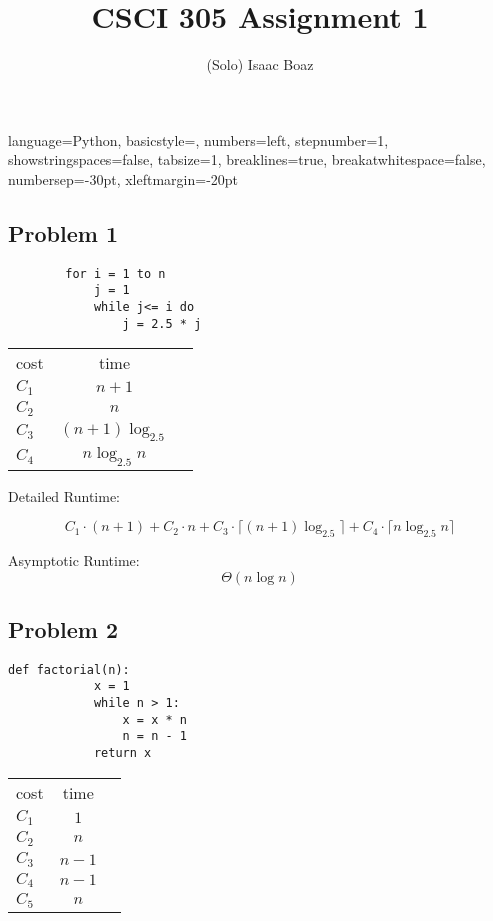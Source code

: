\documentclass{article}
\title{CSCI 305 Assignment 1}
\author{(Solo) Isaac Boaz}
\begin{document}
\maketitle

\lstset
{ %
    language=Python,
    basicstyle=\footnotesize,
    numbers=left,
    stepnumber=1,
    showstringspaces=false,
    tabsize=1,
    breaklines=true,
    breakatwhitespace=false,
    numbersep=-30pt,
    xleftmargin=-20pt
}
\setlength{\columnseprule}{0.1pt}

\subsection*{Problem 1}
\begin{multicols}{2}
    \begin{lstlisting}
        for i = 1 to n
            j = 1
            while j<= i do
                j = 2.5 * j
    \end{lstlisting}
    \columnbreak
    \footnotesize
    \begin{tabular}{lcc}
        cost  & time                 \\
        $C_1$ & $n + 1$              \\
        $C_2$ & $n$                  \\
        $C_3$ & $(n + 1) \log_{2.5}$ \\
        $C_4$ & $n \log_{2.5} n$
    \end{tabular}
\end{multicols}

Detailed Runtime:

\begin{equation*}
    C_1 \cdot (n + 1) + C_2 \cdot n + C_3 \cdot \lceil (n+1) \log_{2.5} \rceil + C_4 \cdot \lceil n \log_{2.5}n \rceil
\end{equation*}

Asymptotic Runtime:
\begin{equation*}
    \Theta(n \log n)
\end{equation*}

\subsection*{Problem 2}
\begin{multicols}{2}
    \begin{lstlisting}[firstnumber=0]
        def factorial(n):
            x = 1
            while n > 1:
                x = x * n
                n = n - 1
            return x
    \end{lstlisting}
    \columnbreak
    \footnotesize
    \begin{tabular}{lcc}
        cost  & time    \\
        $C_1$ & $1$     \\
        $C_2$ & $n$     \\
        $C_3$ & $n - 1$ \\
        $C_4$ & $n - 1$ \\
        $C_5$ & $n$     \\
    \end{tabular}
\end{multicols}
\end{document}
